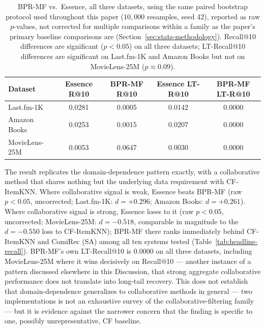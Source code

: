\documentclass[11pt,a4paper]{article}
\begin{document}
\begin{table}[H]
\centering
\caption{BPR-MF vs.\ Essence, all three datasets, using the same paired
         bootstrap protocol used throughout this paper ($10{,}000$
         resamples, seed 42), reported as raw $p$-values, not corrected
         for multiple comparisons within a family as the paper's primary
         baseline comparisons are (Section~\ref{sec:stats-methodology}).
         Recall@10 differences are significant ($p<0.05$) on all three
         datasets; LT-Recall@10 differences are significant on Last.fm-1K
         and Amazon Books but not on MovieLens-25M ($p\approx0.09$).}
\label{tab:bprmf}
\small
\setlength{\tabcolsep}{4pt}
\begin{tabular}{lcccc}
\toprule
\textbf{Dataset} & \textbf{Essence R@10} & \textbf{BPR-MF R@10} & \textbf{Essence LT-R@10} & \textbf{BPR-MF LT-R@10} \\
\midrule
Last.fm-1K     & 0.0281 & 0.0005 & 0.0142 & 0.0000 \\
Amazon Books   & 0.0253 & 0.0015 & 0.0207 & 0.0000 \\
MovieLens-25M  & 0.0053 & 0.0647 & 0.0030 & 0.0000 \\
\bottomrule
\end{tabular}
\end{table}

The result replicates the domain-dependence pattern exactly, with a
collaborative method that shares nothing but the underlying data
requirement with CF-ItemKNN. Where collaborative signal is weak,
Essence beats BPR-MF (raw $p<0.05$, uncorrected; Last.fm-1K: $d=+0.296$;
Amazon Books: $d=+0.261$). Where collaborative signal is strong, Essence
loses to it (raw $p<0.05$, uncorrected; MovieLens-25M: $d=-0.518$, comparable in
magnitude to the $d=-0.550$ loss to CF-ItemKNN); BPR-MF there ranks
immediately behind CF-ItemKNN and ComiRec (SA) among all ten systems
tested (Table~\ref{tab:headline-recall}). BPR-MF's own LT-Recall@10 is
$0.0000$ on all three datasets, including MovieLens-25M where it wins
decisively on Recall@10 --- another instance of a pattern discussed
elsewhere in this Discussion, that strong aggregate collaborative
performance does not translate into long-tail recovery. This does not
establish that domain-dependence generalizes to collaborative methods in
general --- two implementations is not an exhaustive survey of the
collaborative-filtering family --- but it is evidence against the
narrower concern that the finding is specific to one, possibly
unrepresentative, CF baseline.
\end{document}
